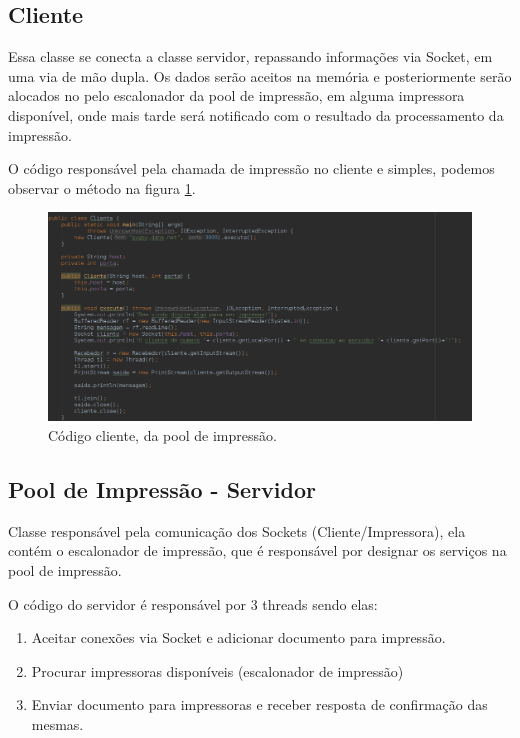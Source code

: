 \documentclass[12pt]{article}
\begin{document}
\subsection{Cliente}
	Essa classe  se conecta a classe servidor, repassando informações via Socket, em uma via de mão dupla.
Os dados serão aceitos na memória e posteriormente serão alocados no pelo escalonador da pool de impressão, em alguma impressora disponível, onde mais tarde será notificado com o resultado da processamento da impressão.

O código responsável pela chamada de impressão no cliente e simples, podemos observar o método na figura  \ref{fig:screenshot005}.

\begin{figure}[H]
	\centering
	\includegraphics[width=1\linewidth]{imagens/screenshot005}
	\caption{Código cliente, da pool de impressão.}
	\label{fig:screenshot005}
\end{figure}



\subsection{Pool de Impressão - Servidor}\label{pool}
  Classe responsável pela comunicação dos Sockets (Cliente/Impressora), ela contém o escalonador  de impressão, que  é responsável por designar os serviços na pool de impressão.
  
	  O código do servidor é responsável por 3 threads sendo elas:
	  \begin{enumerate}
	  	\item Aceitar conexões via Socket e adicionar documento para impressão.
	  	\item Procurar impressoras disponíveis (escalonador de impressão)
	  	\item Enviar documento para impressoras e receber resposta de confirmação das mesmas.
	  \end{enumerate}
	
\end{document}
